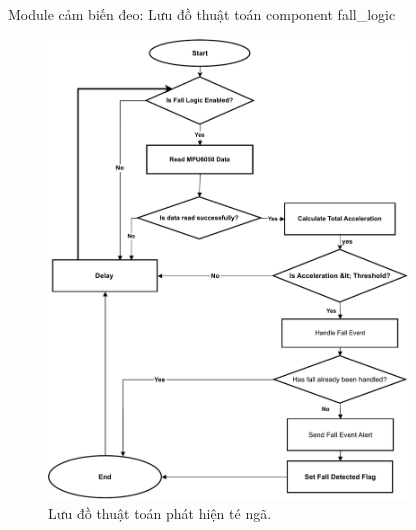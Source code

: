 \begin{frame}[fragile]{Module cảm biến đeo: Lưu đồ thuật toán component fall\_logic}
    \begin{figure}
        \centering
        \includegraphics[width=0.85\textwidth,height=0.7\textheight,keepaspectratio]{images/module1_fall_logic_diagram.pdf}
        \caption{Lưu đồ thuật toán phát hiện té ngã.}
        \label{fig:fall_logic_flow}
    \end{figure}
\end{frame}
